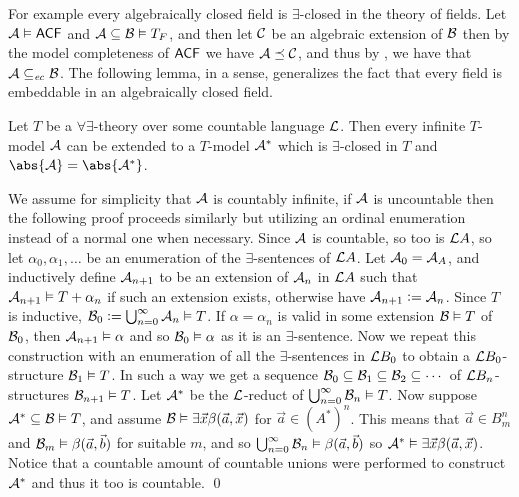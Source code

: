 \edefn

For example every algebraically closed field is $\exists$-closed in the theory of fields.
Let ${\cal A}\vDash{\sf ACF}$ and ${\cal A}\subseteq{\cal B}\vDash T_F$, and then let ${\cal C}$ be an algebraic extension of ${\cal B}$ then by the model completeness of ${\sf ACF}$ we have
${\cal A}\preceq{\cal C}$, and thus by , we have that ${\cal A}\subseteq_{\it ec}{\cal B}$.
The following lemma, in a sense, generalizes the fact that every field is embeddable in an algebraically closed field.

\blemm

    Let $T$ be a $\forall\exists$-theory over some countable language ${\cal L}$.
    Then every infinite $T$-model ${\cal A}$ can be extended to a $T$-model ${\cal A}^*$ which is $\exists$-closed in $T$ and $\abs{{\cal A}}=\abs{{\cal A}^*}$.

\elemm

We assume for simplicity that ${\cal A}$ is countably infinite, if ${\cal A}$ is uncountable then the following proof proceeds similarly but utilizing an ordinal enumeration instead of a normal one when
necessary.
Since ${\cal A}$ is countable, so too is ${\cal L}A$, so let $\alpha_0,\alpha_1,\dots$ be an enumeration of the $\exists$-sentences of ${\cal L}A$.
Let ${\cal A}_0={\cal A}_A$, and inductively define ${\cal A}_{n+1}$ to be an extension of ${\cal A}_n$ in ${\cal L}A$ such that ${\cal A}_{n+1}\vDash T+\alpha_n$ if such an extension exists, otherwise
have ${\cal A}_{n+1}\coloneqq{\cal A}_n$.
Since $T$ is inductive, ${\cal B}_0\coloneqq\bigcup_{n=0}^\infty{\cal A}_n\vDash T$.
If $\alpha=\alpha_n$ is valid in some extension ${\cal B}\vDash T$ of ${\cal B}_0$, then ${\cal A}_{n+1}\vDash\alpha$ and so ${\cal B}_0\vDash\alpha$ as it is an $\exists$-sentence.
Now we repeat this construction with an enumeration of all the $\exists$-sentences in ${\cal L}B_0$ to obtain a ${\cal L}B_0$-structure ${\cal B}_1\vDash T$.
In such a way we get a sequence ${\cal B}_0\subseteq{\cal B}_1\subseteq{\cal B}_2\subseteq\cdots$ of ${\cal L}B_n$-structures ${\cal B}_{n+1}\vDash T$.
Let ${\cal A}^*$ be the ${\cal L}$-reduct of $\bigcup_{n=0}^\infty{\cal B}_n\vDash T$.
Now suppose ${\cal A}^*\subseteq{\cal B}\vDash T$, and assume ${\cal B}\vDash\exists\vec x\beta(\vec a,\vec x)$ for $\vec a\in(A^*)^n$.
This means that $\vec a\in B_m^n$ and ${\cal B}_m\vDash\beta(\vec a,\vec b)$ for suitable $m$, and so $\bigcup_{n=0}^\infty{\cal B}_n\vDash\beta(\vec a,\vec b)$ so
${\cal A}^*\vDash\exists\vec x\beta(\vec a,\vec x)$.
Notice that a countable amount of countable unions were performed to construct ${\cal A}^*$ and thus it too is countable.
\qed

